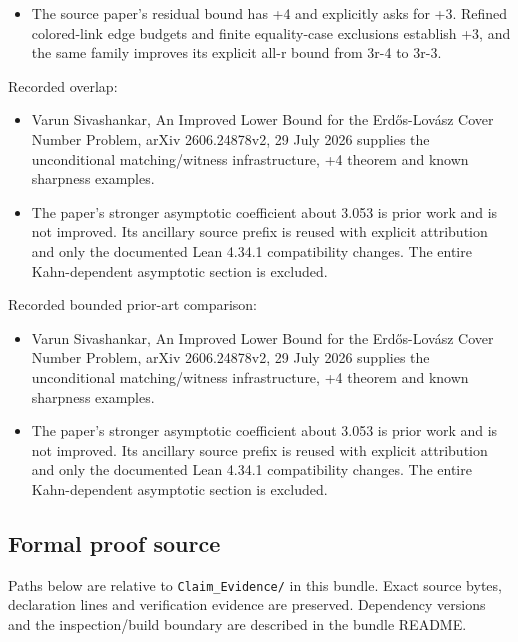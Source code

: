 \documentclass[11pt,a4paper]{article}
\begin{document}
\begin{itemize}
\item The source paper's residual bound has +4 and explicitly asks for +3. Refined colored-link edge budgets and finite equality-case exclusions establish +3, and the same family improves its explicit all-r bound from 3r-4 to 3r-3.
\end{itemize}
Recorded overlap:

\begin{itemize}
\item Varun Sivashankar, An Improved Lower Bound for the Erdős-Lovász Cover Number Problem, arXiv 2606.24878v2, 29 July 2026 supplies the unconditional matching/witness infrastructure, +4 theorem and known sharpness examples.
\end{itemize}
\begin{itemize}
\item The paper's stronger asymptotic coefficient about 3.053 is prior work and is not improved. Its ancillary source prefix is reused with explicit attribution and only the documented Lean 4.34.1 compatibility changes. The entire Kahn-dependent asymptotic section is excluded.
\end{itemize}
Recorded bounded prior-art comparison:

\begin{itemize}
\item Varun Sivashankar, An Improved Lower Bound for the Erdős-Lovász Cover Number Problem, arXiv 2606.24878v2, 29 July 2026 supplies the unconditional matching/witness infrastructure, +4 theorem and known sharpness examples.
\end{itemize}
\begin{itemize}
\item The paper's stronger asymptotic coefficient about 3.053 is prior work and is not improved. Its ancillary source prefix is reused with explicit attribution and only the documented Lean 4.34.1 compatibility changes. The entire Kahn-dependent asymptotic section is excluded.
\end{itemize}
\subsection{Formal proof source}
Paths below are relative to \texttt{Claim\_Evidence/} in this bundle. Exact source bytes, declaration lines and verification evidence are preserved. Dependency versions and the inspection/build boundary are described in the bundle README.
\end{document}
